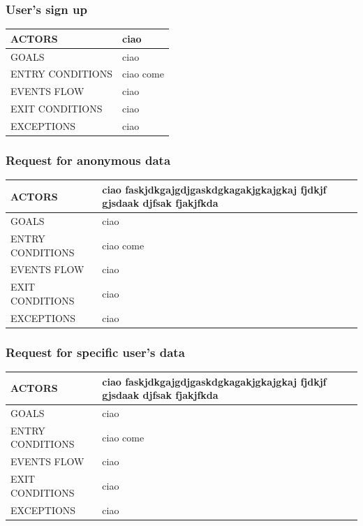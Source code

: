 \documentclass[a4paper]{article}
\begin{document}
\subsubsection{User's sign up}
\begin{center}
    \begin{tabular}{ l || p{6cm} ||}
        ACTORS & ciao \\ \hline
        GOALS & ciao \\ \hline
        ENTRY CONDITIONS & ciao come  \\ \hline
        EVENTS FLOW & ciao\\ \hline
        EXIT CONDITIONS & ciao\\ \hline
        EXCEPTIONS & ciao\\ \hline \hline
    \end{tabular}
\end{center}

\vspace{1cm}

\subsubsection{Request for anonymous data}
\begin{center}
    \begin{tabular}{l || p{6cm} ||}
        ACTORS & ciao faskjdkgajgdjgaskdgkagakjgkajgkaj fjdkjf gjsdaak djfsak fjakjfkda \\ \hline
        GOALS & ciao \\ \hline
        ENTRY CONDITIONS & ciao come  \\ \hline
        EVENTS FLOW & ciao\\ \hline
        EXIT CONDITIONS & ciao\\ \hline
        EXCEPTIONS & ciao\\ \hline \hline
    \end{tabular}
\end{center}

\vspace{1cm}

\subsubsection{Request for specific user's data}
\begin{center}
    \begin{tabular}{l || p{6cm} ||}
        ACTORS & ciao faskjdkgajgdjgaskdgkagakjgkajgkaj fjdkjf gjsdaak djfsak fjakjfkda \\ \hline
        GOALS & ciao \\ \hline
        ENTRY CONDITIONS & ciao come  \\ \hline
        EVENTS FLOW & ciao\\ \hline
        EXIT CONDITIONS & ciao\\ \hline
        EXCEPTIONS & ciao\\ \hline \hline
    \end{tabular}
\end{center}
\end{document}
